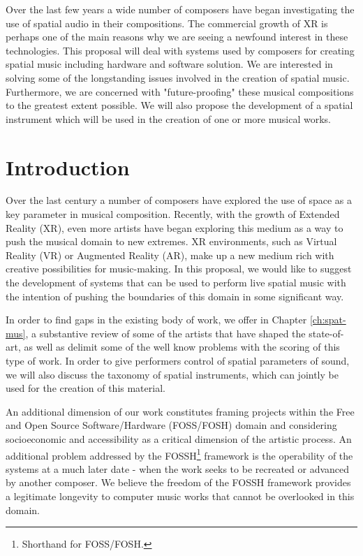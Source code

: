 Over the last few years a wide number of composers have began investigating the use of spatial audio in their compositions. The commercial growth of XR is perhaps one of the main reasons why we are seeing a newfound interest in these technologies. This proposal will deal with systems used by composers for creating spatial music including hardware and software solution. We are interested in solving some of the longstanding issues involved in the creation of spatial music. Furthermore, we are concerned with "future-proofing" these musical compositions to the greatest extent possible. We will also propose the development of a spatial instrument which will be used in the creation of one or more musical works.

\section{Introduction}

Over the last century a number of composers have explored the use of space as a key parameter in musical composition. Recently, with the growth of Extended Reality (XR), even more artists have began exploring this medium as a way to push the musical domain to new extremes. XR environments, such as Virtual Reality (VR) or Augmented Reality (AR), make up a new medium rich with creative possibilities for music-making. In this proposal, we would like to suggest the development of systems that can be used to perform live spatial music with the intention of pushing the boundaries of this domain in some significant way. 

In order to find gaps in the existing body of work, we offer in Chapter \ref{ch:spat-mus}, a substantive review of some of the artists that have shaped the state-of-art, as well as delimit some of the well know problems with the scoring of this type of work. In order to give performers control of spatial parameters of sound, we will also discuss the taxonomy of spatial instruments, which can jointly be used for the creation of this material. 

An additional dimension of our work constitutes framing projects within the Free and Open Source Software/Hardware (FOSS/FOSH) domain and considering socioeconomic and accessibility as a critical dimension of the artistic process. An additional problem addressed by the FOSSH\footnote{Shorthand for FOSS/FOSH.} framework is the operability of the systems at a much later date - when the work seeks to be recreated or advanced by another composer. We believe the freedom of the FOSSH framework provides a legitimate longevity to computer music works that cannot be overlooked in this domain. 

